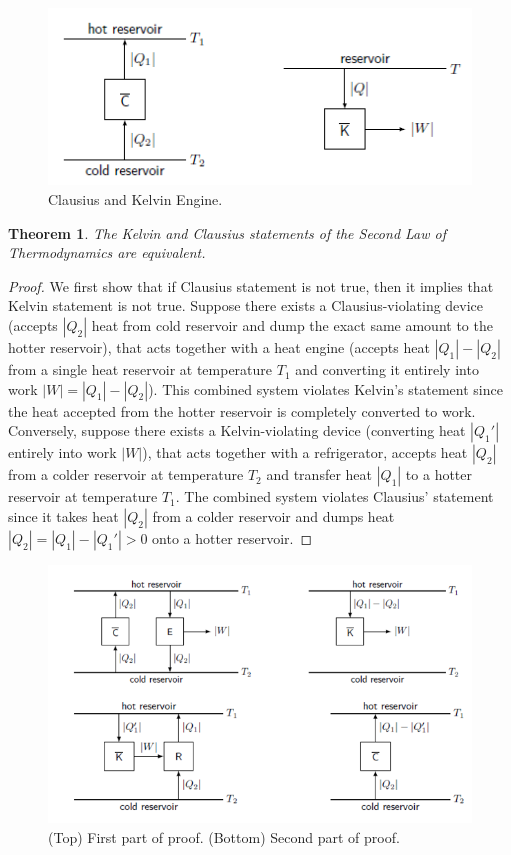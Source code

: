 \documentclass[a4paper]{article}
\theoremstyle{new}
\newtheorem{thm}{Theorem}[section]
\begin{document}
\begin{figure}[H]
    \centering
    \includegraphics[scale=0.8]{secondlaw1.PNG}
    \caption{Clausius and Kelvin Engine. \cite{blundell2010concepts}}
\end{figure}
\begin{thm}
The Kelvin and Clausius statements of the Second Law of Thermodynamics are equivalent.
\end{thm}
\begin{proof}
We first show that if Clausius statement is not true, then it implies that Kelvin statement is not true. Suppose there exists a Clausius-violating device (accepts $|Q_2|$ heat from cold reservoir and dump the exact same amount to the hotter reservoir), that acts together with a heat engine (accepts heat $|Q_1|-|Q_2|$ from a single heat reservoir at temperature $T_1$ and converting it entirely into work $|W|=|Q_1|-|Q_2|$). This combined system violates Kelvin's statement since the heat accepted from the hotter reservoir is completely converted to work.\\[5pt]
Conversely, suppose there exists a Kelvin-violating device (converting heat $|Q_1'|$ entirely into work $|W|$), that acts together with a refrigerator, accepts heat $|Q_2|$ from a colder reservoir at temperature $T_2$ and transfer heat $|Q_1|$ to a hotter reservoir at temperature $T_1$. The combined system violates Clausius' statement since it takes heat $|Q_2|$ from a colder reservoir and dumps heat $|Q_2|=|Q_1|-|Q_1'|>0$ onto a hotter reservoir.
\end{proof}
\begin{figure}[H]
    \centering
    \includegraphics[scale=0.8]{secondlaw2.PNG}
    \caption{(Top) First part of proof. (Bottom) Second part of proof. \cite{blundell2010concepts}}
\end{figure}
\end{document}
